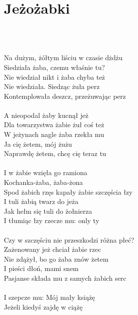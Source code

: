 \documentclass[a5paper, 10pt]{book}
\begin{document}
\section{Jeżożabki}\textcolor{lightgray}{\textit{}}\\~\\
\begin{minipage}[t]{0.8\textwidth}
Na dużym, żółtym liściu w czasie dżdżu\\
Siedziała żaba, czemu właśnie tu?\\
Nie wiedział nikt i żaba chyba też\\
Nie wiedziała. Siedząc żuła perz\\
Kontemplowała deszcz, przeżuwając perz\\
\\
A nieopodal żaby kucnął jeż\\
Dla towarzystwa żabie żuł coś też\\
W jeżynach nagle żaba rzekła mu\\
Ja cię żetem, mój żużu\\
Naprawdę żetem, chcę cię teraz tu\\
\\
\hspace*{5mm}I w żabie wzięła go ramiona \\
\hspace*{5mm}Kochanka-żaba, żaba-żona \\
\hspace*{5mm}Spod żabich rzęs kapały żabie szczęścia łzy\\
\hspace*{5mm}I tuli żabią twarz do jeża\\
\hspace*{5mm}Jak hełm się tuli do żołnierza \\
\hspace*{5mm}I tłumiąc łzy rzecze mu: only ty\\
\\
Czy w szczęściu nie przeszkodzi różna płeć?\\
Zażenowany jeż chciał żabie rzec \\
Nie zdążył, bo go żaba znów żetem\\
I pieści dłoń, mami snem \\
Pasjanse składa mu z samych żabich serc\\
\\
\hspace*{5mm}I szepcze mu: Mój mały książę\\
\hspace*{5mm}Jeżeli kiedyś zajdę w ciążę \\

\end{minipage}
\end{document}
